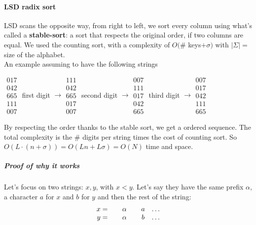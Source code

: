 \documentclass[10pt]{report}
\begin{document}
\paragraph{LSD radix sort} LSD scans the opposite way, from right to left, we sort every column using what's called a \textbf{stable-sort}: a sort that respects the original order, if two columns are equal. We used the counting sort, with a complexity of $O(\#$ keys$ + \sigma)$ with $|\Sigma| =$ size of the alphabet.\\
An example assuming to have the following strings \begin{list}{}{}
	\item $\begin{array}{c}
	017\\042\\665\\111\\007
	\end{array}$ first digit $\rightarrow\begin{array}{c}
	111\\042\\665\\017\\007
	\end{array}$ second digit $\rightarrow\begin{array}{c}
	007\\111\\017\\042\\665
	\end{array}$ third digit $\rightarrow\begin{array}{c}
	007\\017\\042\\111\\665
	\end{array}$
\end{list}
By respecting the order thanks to the stable sort, we get a ordered sequence. The total complexity is the $\#$ digits per string times the cost of counting sort. So $O(L\cdot(n+\sigma)) = O(Ln + L\sigma) = O(N)$ time and space.
\subparagraph{Proof of why it works} Let's focus on two strings: $x,y$, with $x<y$. Let's say they have the same prefix $\alpha$, a character $a$ for $x$ and $b$ for $y$ and then the rest of the string: $$\begin{array}{r c c c}
x = & \:\:\:\:\:\alpha\:\:\:\:\: & a & \ldots\\
y = & \:\:\:\:\:\alpha\:\:\:\:\: & b & \ldots\\
\end{array}$$
\end{document}

